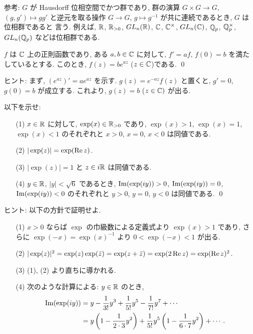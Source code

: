 \documentclass[12pt,twoside]{jarticle}
\def\Q{{\Bbb Q}} %
\def\R{{\Bbb R}} %
\def\C{{\Bbb C}} %
\def\Repart{\mathop{\text{\rm Re}}\nolimits} %
\def\Impart{\mathop{\text{\rm Im}}\nolimits} %
\begin{document}
\noindent 参考: $G$ が Hausdorff 位相空間でかつ群であり, 群の演算 %
$G\times G \to G$, $(g,g')\mapsto gg'$ と逆元を取る操作 %
$G\to G$, $g\mapsto g^{-1}$ が共に連続であるとき, $G$ は位相群であると
言う. 例えば, $\R$, $\R_{>0}$, $GL_n(\R)$, $\C$, $\C^{\times}$,
$GL_n(\C)$, $\Q_p$, $\Q_p^{\times}$, $GL_n(\Q_p)$ などは位相群である.

\begin{question}
  $f$ は $\C$ 上の正則函数であり, ある $a,b\in\C$ に対して,
  $f'=af$, $f(0)=b$ を満たしているとする. このとき, 
  $f(z) = b e^{az}$ ($z\in\C$)である.  \qed
\end{question}

\noindent ヒント: まず, $(e^{az})'=a e^{az}$ を示す.
$g(z)=e^{-az}f(z)$ と置くと, $g'=0$, $g(0)=b$ が成立する. これより,
$g(z)=b$ ($z\in\C)$ が出る.

\begin{question}\label{q:exp2}
  以下を示せ: 
  \begin{enumerate}
  \item[(1)] $x\in\R$ に対して, $\exp(x)\in\R_{>0}$ であり, %
    $\exp(x)>1$, $\exp(x)=1$, $\exp(x)<1$ のそれぞれと $x>0$, $x=0$,
    $x<0$ は同値である. 
  \item[(2)] $|\exp(z)|=\exp(\Repart z)$.  
  \item[(3)] $|\exp(z)|=1$ と $z\in i\R$ は同値である.
  \item[(4)] $y\in\R$, $|y|<\sqrt{6}$ であるとき, %
    $\Impart(\exp(iy))>0$, $\Impart(\exp(iy))=0$,
    $\Impart(\exp(iy))<0$ のそれぞれと $y>0$, $y=0$, $y<0$ は同値である.
    \qed
  \end{enumerate}
\end{question}

\noindent ヒント: 以下の方針で証明せよ.
\begin{enumerate}
\item[(1)] $x>0$ ならば $\exp$ の巾級数による定義式より %
  $\exp(x)>1$ であり, さらに $\exp(-x)=\exp(x)^{-1}$ 
  より $0<\exp(-x)<1$ が出る.  
\item[(2)] $|\exp(z)|^2=\exp(z)\exp(\bar z)=\exp(z+\bar z)
  =\exp(2\Repart z)=\exp(\Repart z)^2$.
\item[(3)] (1), (2) より直ちに導かれる.
\item[(4)] 次のような計算による: $y\in\R$ のとき,
  \begin{align*}
    \Impart(\exp(iy)) & =
    y - \frac{1}{3!}y^3 
    + \frac{1}{5!}y^5 - \frac{1}{7!}y^7 + \cdots
    \\
    & =
    y \left(1 - \frac{1}{2\cdot3}y^2 \right)
    + \frac{1}{5!}y^5 \left(1 - \frac{1}{6\cdot7}y^2 \right)
    + \cdots.
  \end{align*}
\end{enumerate}
\end{document}
